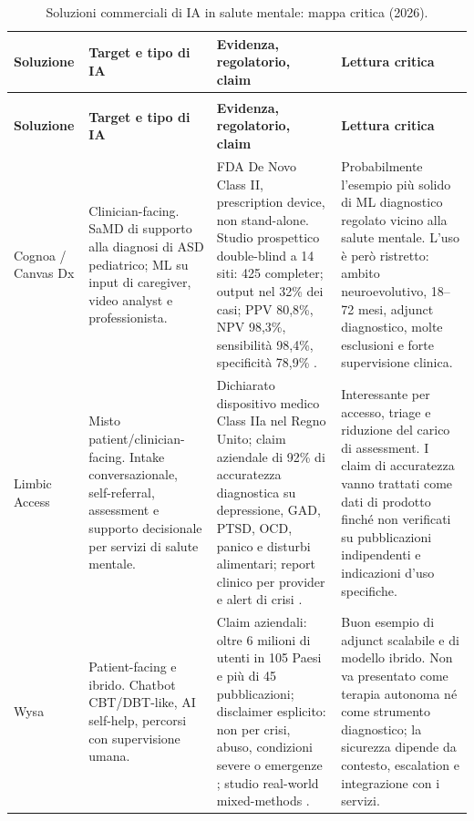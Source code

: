 \documentclass[11pt,a4paper]{article}
\begin{document}
\begin{longtable}{>{\RaggedRight}p{2.2cm} >{\RaggedRight}p{3.4cm} >{\RaggedRight}p{4.0cm} >{\RaggedRight}p{4.0cm}}
\caption{Soluzioni commerciali di IA in salute mentale: mappa critica (2026).}
\label{tab:mappa}\\
\toprule
\textbf{Soluzione} & \textbf{Target e tipo di IA} & \textbf{Evidenza, regolatorio, claim} & \textbf{Lettura critica} \\
\midrule
\endfirsthead
\multicolumn{4}{l}{\footnotesize\itshape Tabella \ref{tab:mappa} (continua)}\\
\toprule
\textbf{Soluzione} & \textbf{Target e tipo di IA} & \textbf{Evidenza, regolatorio, claim} & \textbf{Lettura critica} \\
\midrule
\endhead
\bottomrule
\endlastfoot
\small Cognoa / Canvas Dx & \small Clinician-facing. SaMD di supporto alla diagnosi di ASD pediatrico; ML su input di caregiver, video analyst e professionista. & \small FDA De Novo Class II, prescription device, non stand-alone. Studio prospettico double-blind a 14 siti: 425 completer; output nel 32\% dei casi; PPV 80,8\%, NPV 98,3\%, sensibilità 98,4\%, specificità 78,9\% \cite{fda-cognoa}. & \small Probabilmente l'esempio più solido di ML diagnostico regolato vicino alla salute mentale. L'uso è però ristretto: ambito neuroevolutivo, 18--72 mesi, adjunct diagnostico, molte esclusioni e forte supervisione clinica. \\
\addlinespace
\small Limbic Access & \small Misto patient/clinician-facing. Intake conversazionale, self-referral, assessment e supporto decisionale per servizi di salute mentale. & \small Dichiarato dispositivo medico Class IIa nel Regno Unito; claim aziendale di 92\% di accuratezza diagnostica su depressione, GAD, PTSD, OCD, panico e disturbi alimentari; report clinico per provider e alert di crisi \cite{limbic}. & \small Interessante per accesso, triage e riduzione del carico di assessment. I claim di accuratezza vanno trattati come dati di prodotto finché non verificati su pubblicazioni indipendenti e indicazioni d'uso specifiche. \\
\addlinespace
\small Wysa & \small Patient-facing e ibrido. Chatbot CBT/DBT-like, AI self-help, percorsi con supervisione umana. & \small Claim aziendali: oltre 6 milioni di utenti in 105 Paesi e più di 45 pubblicazioni; disclaimer esplicito: non per crisi, abuso, condizioni severe o emergenze \cite{wysa}; studio real-world mixed-methods \cite{inkster2018}. & \small Buon esempio di adjunct scalabile e di modello ibrido. Non va presentato come terapia autonoma né come strumento diagnostico; la sicurezza dipende da contesto, escalation e integrazione con i servizi. \\

\end{longtable}
\end{document}
